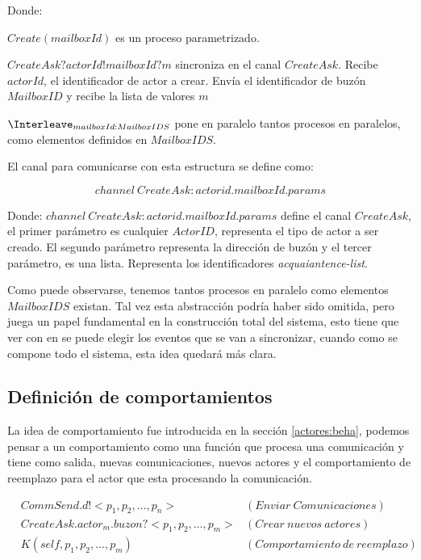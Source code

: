 Donde:

\begin{description}
 \item $Create(mailboxId)$ es un proceso parametrizado.
 \item $CreateAsk?actorId!mailboxId?m$ sincroniza en el canal $CreateAsk$. Recibe $actorId$, el identificador de actor a crear. Envía el identificador de buzón $MailboxID$ y recibe la lista de valores $m$
 \item $\Interleave_{mailboxId : MailboxIDS}$ pone en paralelo tantos procesos en paralelos, como elementos definidos en $MailboxIDS$.  
\end{description}

El canal para comunicarse con esta estructura se define como:

\[
channel\ CreateAsk:actorid.mailboxId.params
\]

Donde: $channel\ CreateAsk:actorid.mailboxId.params$ define el canal $CreateAsk$, el primer parámetro es cualquier $ActorID$, representa el tipo de actor a ser creado. El segundo parámetro representa la dirección de buzón y el tercer parámetro, es una lista. Representa los identificadores \textit{acquaiantence-list}. 

Como puede observarse, tenemos tantos procesos en paralelo como elementos $MailboxIDS$ existan. Tal vez esta abstracción podría haber sido omitida, pero juega un papel fundamental en la construcción total del sistema, esto tiene que ver con en \CSP se puede elegir los eventos \cite[chap.~2,p.~55]{Roscoe:1997:TPC:550448} que se van a sincronizar, cuando como se compone todo el sistema, esta idea quedará más clara.

\subsection{Definición de comportamientos}
La idea de comportamiento fue introducida en la sección \ref{actores:beha}, podemos pensar a un comportamiento como una función que procesa una comunicación y tiene como salida, nuevas comunicaciones, nuevos actores y el comportamiento de reemplazo para el actor que esta procesando la comunicación.

\begin{align*}
&CommSend.d!<p_1, p_2, \ldots, p_n> & (Enviar\ Comunicaciones) \\ 
&CreateAsk.actor_m.buzon?<p_1, p_2, \ldots, p_m> & (Crear\ nuevos\ actores)\\
&K(self, p_1, p_2, \ldots, p_m)  & (Comportamiento\ de\ reemplazo)
\end{align*}


